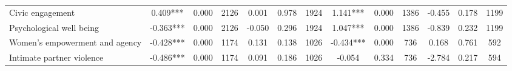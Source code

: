 \begin{tabular}{l*{12}{c}}
 Civic engagement &        0.409*** &        0.000 & 2126    &        0.001 &        0.978 & 1924    &        1.141*** &        0.000 & 1386 &       -0.455 &        0.178 & 1199 \\ 

 Psychological well being &       -0.363*** &        0.000 & 2126    &       -0.050 &        0.296 & 1924    &        1.047*** &        0.000 & 1386 &       -0.839 &        0.232 & 1199 \\ 

 Women's empowerment and agency &       -0.428*** &        0.000 & 1174    &        0.131 &        0.138 & 1026    &       -0.434*** &        0.000 & 736 &        0.168 &        0.761 & 592 \\ 

 Intimate partner violence &       -0.486*** &        0.000 & 1174    &        0.091 &        0.186 & 1026    &       -0.054 &        0.334 & 736 &       -2.784 &        0.217 & 594 \\ 

\hline \end{tabular}
